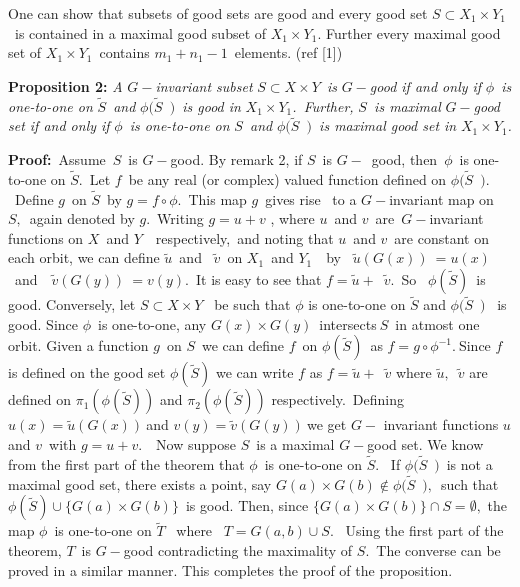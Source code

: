 \documentclass{article}
\begin{document}
{\large One can show that subsets of good sets are good and every good set $%
S\subset X_{1}\times Y_{1}$\ is contained in a maximal good subset of $%
X_{1}\times Y_{1}$. Further every maximal good set of $X_{1}\times Y_{1}$\
contains $m_{1}+n_{1}-1$\ elements. (ref [1])}

{\large \bigskip }

{\large \textbf{Proposition 2: }\emph{A }$G-$\emph{invariant subset }$%
S\subset X\times Y$\emph{\ is }$G-$\emph{good if and only if }$\phi $\emph{\
is one-to-one on }$\widetilde{S}$\emph{\ and }$\phi (\widetilde{S}$\emph{\ }$%
)$\emph{\ is good in }$X_{1}\times Y_{1}$\emph{.\ Further, }$S$\emph{\ is
maximal }$G-$\emph{good set if and only if }$\phi $\emph{\ is one-to-one on }%
$S$\emph{\ and }$\phi (\widetilde{S}$\emph{\ }$)$\emph{\ is maximal good set
in }$X_{1}\times Y_{1}$\emph{.} }

{\large \bigskip}

{\large \textbf{Proof:}\ Assume\ $S$\ is $G-$good. By remark 2, if $S$\ is $%
G-$\ good, then\ $\phi $\ is one-to-one on $\widetilde{S}.$\ Let $f$\ be any
real (or complex) valued function defined on $\phi (\widetilde{S}$\ $).$\
Define $g$\ on $\widetilde{S}$\ by $g=f\circ \phi .$\ This map $g$\ gives
rise \ to a $G-$invariant map on $S,$\ again denoted by $g.$\ Writing $g=u+v$%
, where $u$\ and $v$\ are\ $G-$invariant functions on $X$\ and $Y$\ \
respectively,\ and noting that $u$\ and $v$\ are constant on each orbit, we
can define $\widetilde{u}$\ and \ $\widetilde{v}$\ on $X_{1}$\ and $Y_{1}$\
\ by \ $\widetilde{u}(G(x))\ =u(x)$\ and\ \ $\widetilde{v}(G(y))\ =v(y).$\
It is easy to see that $f=\widetilde{u}+$\ $\widetilde{v}.$\ So \ $\phi (%
\widetilde{S})$\ is good. Conversely, let $S\subset X\times Y$ \ be such
that $\phi $ is one-to-one on $\widetilde{S}$ and $\phi (\widetilde{S}$\ $)$%
\ is good. Since $\phi $\ is one-to-one, any $G(x)\times G(y)$\ intersects$\
S$\ in atmost one orbit. Given a function $g$\ on $S$\ we can define $f$\ on
$\phi (\widetilde{S})$\ as $f=g\circ \phi ^{-1}.\ $Since $f$ is defined on
the good set $\phi (\widetilde{S})$ we can write $f$ as $f=\widetilde{u}+$\ $%
\widetilde{v}$ where $\widetilde{u},$\ $\widetilde{v}$ are defined on $\pi
_{1}(\phi (\widetilde{S}))$ and $\pi _{2}(\phi (\widetilde{S}))$
respectively.\ Defining $u(x)=\widetilde{u}(G(x))\ $and $v(y)=\widetilde{v}%
(G(y))\ $we get $G-$ invariant functions $u$ and $v$\ with $g=u+v.$\ \ Now
suppose $S$\ is a maximal $G-$good set. We know from the first part of the
theorem that $\phi $\ is one-to-one on $\widetilde{S}.$ \ If $\phi (%
\widetilde{S}$\ $)$\ is not a maximal good set, there exists a point, say $%
G(a)\times G(b)\notin \phi (\widetilde{S}$\ $),$\ such that $\phi (%
\widetilde{S})\cup \{G(a)\times G(b)\}$\ is good. Then, since $\{G(a)\times
G(b)\}\cap S=\emptyset ,$ the map $\phi $\ is one-to-one on $\widetilde{T}$
\ where \ $T=G(a,b)\cup S.$ \ Using the first part of the theorem, $T$\ is $%
G-$good contradicting the maximality of $S.$\ The converse can be proved in
a similar manner. This completes the proof of the proposition. }
\end{document}

